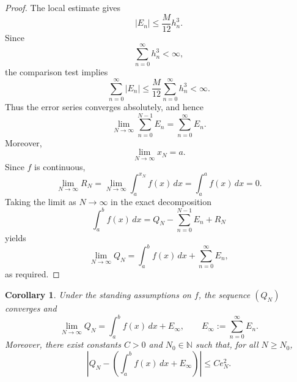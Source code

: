 \documentclass[psamsfonts,reqno]{amsart}
\theoremstyle{plain}
\newtheorem{corollary}[theorem]{Corollary}
\theoremstyle{definition}
\theoremstyle{remark}
\numberwithin{equation}{section}
\begin{document}
\begin{proof}
The local estimate gives
\[
|E_n|
\leq \frac{M}{12}h_n^3.
\]
Since
\[
\sum_{n=0}^{\infty} h_n^3 < \infty,
\]
the comparison test implies
\[
\sum_{n=0}^{\infty}|E_n|
\leq
\frac{M}{12}\sum_{n=0}^{\infty}h_n^3
<\infty.
\]
Thus the error series converges absolutely, and hence
\[
\lim_{N\to\infty}
\sum_{n=0}^{N-1}E_n
=
\sum_{n=0}^{\infty}E_n.
\]
Moreover,
\[
\lim_{N\to\infty}x_N=a.
\]
Since \(f\) is continuous,
\[
\lim_{N\to\infty}R_N
=
\lim_{N\to\infty}\int_a^{x_N}f(x)\,dx
=
\int_a^a f(x)\,dx
=
0.
\]
Taking the limit as \(N\to\infty\) in the exact decomposition
\[
\int_a^b f(x)\,dx
=
Q_N-\sum_{n=0}^{N-1}E_n+R_N
\]
yields
\[
\lim_{N\to\infty}Q_N
=
\int_a^b f(x)\,dx
+
\sum_{n=0}^{\infty}E_n,
\]
as required.
\end{proof}
\begin{corollary}
Under the standing assumptions on $f$, the sequence $(Q_N)$ converges and
\[
\lim_{N\to\infty} Q_N
=
\int_a^b f(x)\,dx + E_\infty,
\qquad
E_\infty:=\sum_{n=0}^{\infty}E_n.
\]
Moreover, there exist constants $C>0$ and $N_0\in\mathbb{N}$ such that, for
all $N\geq N_0$,
\[
\left|
Q_N-
\left(
\int_a^b f(x)\,dx+E_\infty
\right)
\right|
\leq C e_N^2.
\]
\end{corollary}
\end{document}
